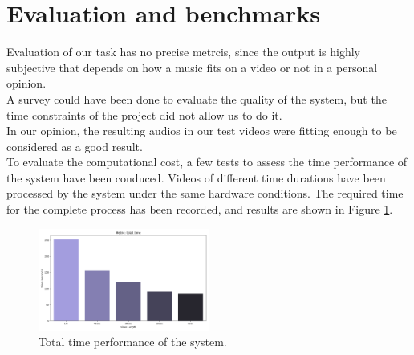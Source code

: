 \documentclass[conference]{IEEEtran}
\begin{document}
\section{Evaluation and benchmarks}
Evaluation of our task has no precise metrcis, since the output is highly subjective that depends on how a music fits on a video or not in a personal opinion.\\ A survey could have been done to evaluate the quality of the system, but the time constraints of the project did not allow us to do it.\\
In our opinion, the resulting audios in our test videos were fitting enough to be considered as a good result.\\
To evaluate the computational cost, a few tests to assess the time performance of the system have been conduced. Videos of different time durations have been processed by the system under the same hardware conditions. The required time for the complete process has been recorded, and results are shown in Figure \ref*{time_performance}.

\begin{figure}[H]
    \centerline{\includegraphics[width=0.5\textwidth]{../Presentation/graphs/total_time.png}}
    \caption{Total time performance of the system.}
    \label{time_performance}
\end{figure}
\end{document}
